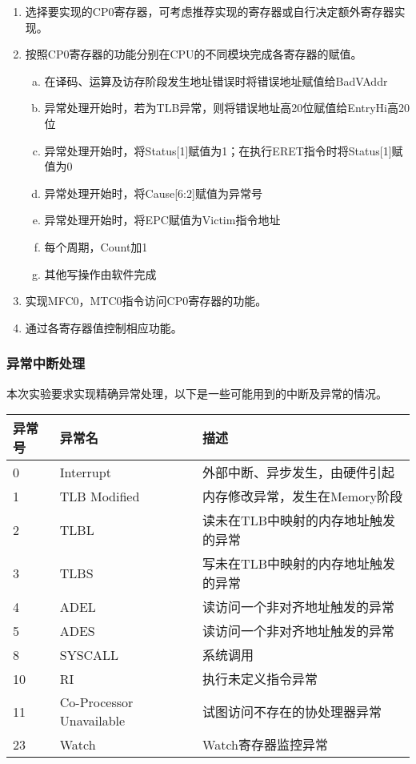 \begin{enumerate}[(1)]
\item 选择要实现的CP0寄存器，可考虑推荐实现的寄存器或自行决定额外寄存器实现。

\item 按照CP0寄存器的功能分别在CPU的不同模块完成各寄存器的赋值。

\begin{enumerate}[(a)]
\item 在译码、运算及访存阶段发生地址错误时将错误地址赋值给BadVAddr

\item 异常处理开始时，若为TLB异常，则将错误地址高20位赋值给EntryHi高20位

\item 异常处理开始时，将Status[1]赋值为1；在执行ERET指令时将Status[1]赋值为0

\item 异常处理开始时，将Cause[6:2]赋值为异常号

\item 异常处理开始时，将EPC赋值为Victim指令地址

\item 每个周期，Count加1

\item 其他写操作由软件完成 
\end{enumerate}

\item 实现MFC0，MTC0指令访问CP0寄存器的功能。

\item 通过各寄存器值控制相应功能。

\end{enumerate}


\subsubsection{异常中断处理}
本次实验要求实现精确异常处理，以下是一些可能用到的中断及异常的情况。

\begin{table}[H]
\centering
\begin{tabular}{lll}
\hline
异常号&异常名&描述\\
\hline
0&Interrupt&外部中断、异步发生，由硬件引起\\
1&TLB Modified&内存修改异常，发生在Memory阶段\\
2&TLBL&读未在TLB中映射的内存地址触发的异常\\
3&TLBS&写未在TLB中映射的内存地址触发的异常\\
4&ADEL&读访问一个非对齐地址触发的异常\\
5&ADES&读访问一个非对齐地址触发的异常\\
8&SYSCALL&系统调用\\
10&RI&执行未定义指令异常\\
11&Co-Processor Unavailable&试图访问不存在的协处理器异常\\
23&Watch&Watch寄存器监控异常\\
\hline
\end{tabular}
\end{table}

